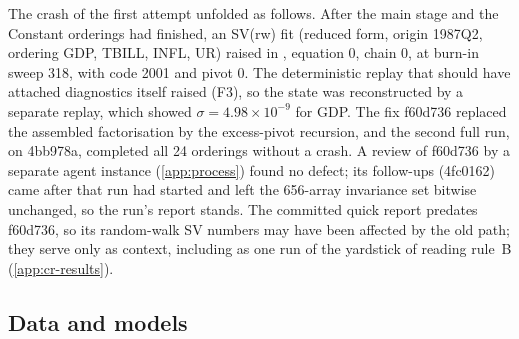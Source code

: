 The crash of the first attempt unfolded as follows.
After the main stage and the Constant orderings had finished, an SV(rw) fit (reduced form, origin
1987Q2, ordering GDP, TBILL, INFL, UR) raised  in , equation 0,
chain 0, at burn-in sweep 318, with code 2001 and pivot 0.
The deterministic replay that should have attached diagnostics itself raised (F3), so the state was
reconstructed by a separate replay, which showed $\sigma = 4.98\times10^{-9}$ for GDP.
The fix f60d736 replaced the assembled factorisation by the excess-pivot recursion, and the second
full run, on 4bb978a, completed all 24 orderings without a crash.
A review of f60d736 by a separate agent instance (\cref{app:process}) found no defect; its
follow-ups (4fc0162) came after that run had
started and left the 656-array invariance set bitwise unchanged, so the run's report stands.
The committed quick report predates f60d736, so its random-walk SV numbers may have been affected by
the old path; they serve only as context, including as one run of the yardstick of reading rule~B
(\cref{app:cr-results}). %

\begin{table}[!htbp]
\centering\small
\caption{Run history of the replication: commit, configuration, machine and load, wall time
and outcome of each run, from the quick run to the acceptance run.}
\label{tab:TabF1}

\end{table}

\subsection{Data and models}\label{app:cr-data}

